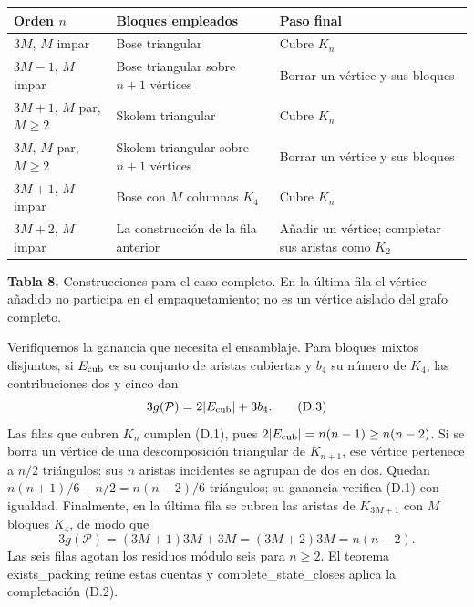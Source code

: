 \documentclass[spanish,11pt,a4paper]{article}
\newcounter{none}
\begin{document}
{\def\LTcaptype{none} %
\begin{longtable}[c]{@{}
  >{\raggedright\arraybackslash}p{}
  >{\raggedright\arraybackslash}p{}
  >{\raggedright\arraybackslash}p{}@{}}
\toprule\noalign{}
\begin{minipage}[b]{\linewidth}\raggedright
Orden \(n\)
\end{minipage} & \begin{minipage}[b]{\linewidth}\raggedright
Bloques empleados
\end{minipage} & \begin{minipage}[b]{\linewidth}\raggedright
Paso final
\end{minipage} \\
\midrule\noalign{}
\endhead
\bottomrule\noalign{}
\endlastfoot
\(3M\), \(M\) impar & Bose triangular & Cubre \(K_n\) \\
\(3M-1\), \(M\) impar & Bose triangular sobre \(n+1\) vértices & Borrar un vértice y sus bloques \\
\(3M+1\), \(M\) par, \(M\ge2\) & Skolem triangular & Cubre \(K_n\) \\
\(3M\), \(M\) par, \(M\ge2\) & Skolem triangular sobre \(n+1\) vértices & Borrar un vértice y sus bloques \\
\(3M+1\), \(M\) impar & Bose con \(M\) columnas \(K_4\) & Cubre \(K_n\) \\
\(3M+2\), \(M\) impar & La construcción de la fila anterior & Añadir un vértice; completar sus aristas como \(K_2\) \\
\end{longtable}
}

\textbf{Tabla 8.} Construcciones para el caso completo. En la última fila el vértice añadido no participa en el empaquetamiento; no es un vértice aislado del grafo completo.

Verifiquemos la ganancia que necesita el ensamblaje. Para bloques mixtos disjuntos, si \(E_{\rm cub}\) es su conjunto de aristas cubiertas y \(b_4\) su número de \(K_4\), las contribuciones dos y cinco dan \[
3g(\mathcal P)=2|E_{\rm cub}|+3b_4.
\tag{D.3}
\] Las filas que cubren \(K_n\) cumplen (D.1), pues \(2|E_{\rm cub}|=n(n-1)\ge n(n-2)\). Si se borra un vértice de una descomposición triangular de \(K_{n+1}\), ese vértice pertenece a \(n/2\) triángulos: sus \(n\) aristas incidentes se agrupan de dos en dos. Quedan \(n(n+1)/6-n/2=n(n-2)/6\) triángulos; su ganancia verifica (D.1) con igualdad. Finalmente, en la última fila se cubren las aristas de \(K_{3M+1}\) con \(M\) bloques \(K_4\), de modo que \[
3g(\mathcal P)=(3M+1)3M+3M=(3M+2)3M=n(n-2).
\tag{D.4}
\] Las seis filas agotan los residuos módulo seis para \(n\ge2\). El teorema {\ttfamily\small exists\_\discretionary{\hbox{\ensuremath{\hookrightarrow}}}{}{}packing} reúne estas cuentas y {\ttfamily\small complete\_\discretionary{\hbox{\ensuremath{\hookrightarrow}}}{}{}state\_\discretionary{\hbox{\ensuremath{\hookrightarrow}}}{}{}closes} aplica la completación (D.2).
\end{document}
